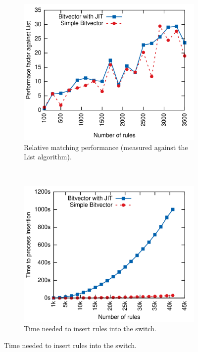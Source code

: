 \documentclass[conference]{IEEEtran}
\begin{document}
\begin{figure}
    \centering
    \begin{subfigure}{.32\linewidth}
        \centering
        \includegraphics[width=\textwidth]{images/eval_w_relative}
        \caption{Relative matching performance (measured against the List algorithm).}
        \label{fig:eval_bad_case_relative}
    \end{subfigure}
    ~
    \begin{subfigure}{.32\linewidth}
        \centering
        \includegraphics[width=\textwidth]{images/eval_time}
        \caption{Time needed to insert rules into the switch.}

\end{subfigure}
\end{figure}
\end{document}
